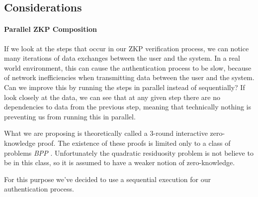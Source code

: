 \subsection{Considerations}
\paragraph{Parallel ZKP Composition}
If we look at the steps that occur in our ZKP verification process, we can notice many iterations of data exchanges between the user and the system.
In a real world environment, this can cause the authentication process to be slow, because of network inefficiencies when transmitting data between the user and the system.
Can we improve this by running the steps in parallel instead of sequentially?
If look closely at the data, we can see that at any given step there are no dependencies to data from the previous step, meaning that technically nothing is preventing us from running this in parallel.

What we are proposing is theoretically called a 3-round interactive zero-knowledge proof.
The existence of these proofs is limited only to a class of problems \textit{BPP} \cite{goldreich1996composition}.
Unfortunately the quadratic residuosity problem is not believe to be in this class, so it is assumed to have a weaker notion of zero-knowledge.

For this purpose we've decided to use a sequential execution for our authentication process.


%
%
%





